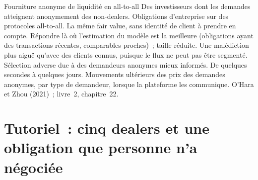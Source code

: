 \begin{strategyfile}{Fourniture anonyme de liquidité en all-to-all}\label{strat:hf:bond-and-etf-request-for-quote-market-making:a2a}
 Des investisseurs dont les demandes atteignent anonymement des non-dealers.
 Obligations d'entreprise sur des protocoles all-to-all.
 La même fair value, sans identité de client à prendre en compte.
 Répondre là où l'estimation du modèle est la meilleure (obligations ayant des transactions récentes, comparables proches)~; taille réduite.
 Une malédiction plus aiguë qu'avec des clients connus, puisque le flux ne peut pas être segmenté.
 Sélection adverse due à des demandeurs anonymes mieux informés.
 De quelques secondes à quelques jours.
 Mouvements ultérieurs des prix des demandes anonymes, par type de demandeur, lorsque la plateforme les communique.
 O'Hara et Zhou (2021)~; livre~2, chapitre~22.
\end{strategyfile}

\section{Tutoriel~: cinq dealers et une obligation que personne n'a négociée}\label{tut:hf:bond-and-etf-request-for-quote-market-making:tut}

